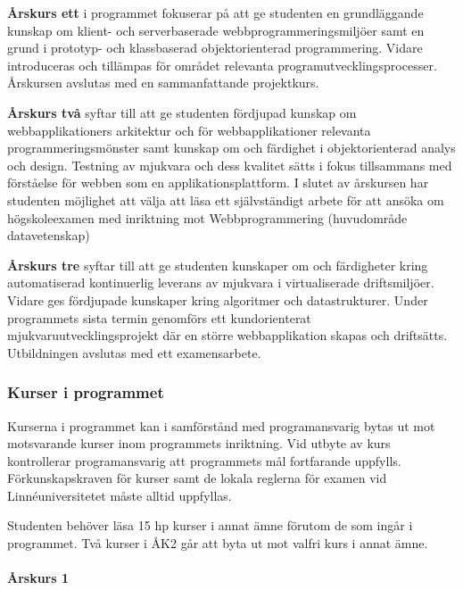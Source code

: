 \documentclass[swedish]{LnuCmThesis}
\begin{document}
\textbf{Årskurs ett} i programmet fokuserar på att ge studenten en grundläggande kunskap om klient- och serverbaserade webbprogrammeringsmiljöer samt en grund i prototyp- och klassbaserad objektorienterad programmering. Vidare introduceras och tillämpas för området relevanta programutvecklingsprocesser. Årskursen avslutas med en sammanfattande projektkurs.

\textbf{Årskurs två} syftar till att ge studenten fördjupad kunskap om webbapplikationers arkitektur och för webbapplikationer relevanta programmeringsmönster samt kunskap om och färdighet i objektorienterad analys och design. Testning av mjukvara och dess kvalitet sätts i fokus tillsammans med förståelse för webben som en applikationsplattform. 
I slutet av årskursen har studenten möjlighet att välja att läsa ett självständigt arbete för att ansöka om högskoleexamen med inriktning mot Webbprogrammering (huvudområde datavetenskap)

\textbf{Årskurs tre} syftar till att ge studenten kunskaper om och färdigheter kring automatiserad kontinuerlig leverans av mjukvara i virtualiserade driftsmiljöer. Vidare ges fördjupade kunskaper kring algoritmer och datastrukturer.
Under programmets sista termin genomförs ett kundorienterat mjukvaruutvecklingsprojekt där en större webbapplikation skapas och driftsätts. 
Utbildningen avslutas med ett examensarbete.

\subsubsection*{Kurser i programmet}

Kurserna i programmet kan i samförstånd med programansvarig bytas ut mot
motsvarande kurser inom programmets inriktning. Vid utbyte av kurs kontrollerar
programansvarig att programmets mål fortfarande uppfylls. Förkunskapskraven för
kurser samt de lokala reglerna för examen vid Linnéuniversitetet måste alltid uppfyllas.

Studenten behöver läsa 15 hp kurser i annat ämne förutom de som ingår i programmet. Två kurser i ÅK2 går att byta ut mot valfri kurs i annat ämne.

\paragraph*{Årskurs 1}
\end{document}
